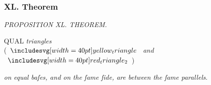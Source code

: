 \documentclass[11pt,preview]{standalone}
\begin{document}
\subsubsection{XL. Theorem}

\begin{minipage}[t]{0.54\textwidth}
    \begin{center}
        \textit{PROPOSITION XL. THEOREM.}\label{book1pr40} \\
    \end{center}

    \hfill

    \begin{center}
        \raggedright \lettrine[lines=3, loversize=1, nindent=0pt]{}{}QUAL \textit{triangles}\\ (\hspace{-2ex}$\img[0][0][40]{yellow_triangle}$ \textit{and} $\img[0][0][40]{red_triangle_2}$\hspace{-2ex})
    \end{center}
    \raggedright \textit{on equal baſes, and on the ſame ſide, are between the ſame parallels}.
\end{minipage}%
\hfill
\begin{minipage}[t]{0.43\textwidth}
    \vspace{20pt}
    
\end{minipage}

\hfill

\hfill
\end{document}
